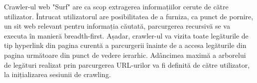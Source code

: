 Crawler-ul web "Surf" are ca scop extragerea informațiilor cerute de către utilizator. Întrucat utilizatorul are posibilitatea de a furniza, ca punct de pornire, un sit web relevant pentru informația căutată, parcurgerea recursivă se va executa în manieră breadth-first. Așadar, crawler-ul va vizita toate legăturile de tip hyperlink din pagina curentă a parcurgerii înainte de a accesa legăturile din pagina următoare din punct de vedere ierarhic. Adâncimea maximă a arborelui de legături realizat prin parcurgerea URL-urilor va fi definită de către utilizator, la inițializarea sesiunii de crawling.